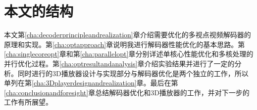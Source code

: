 \section{本文的结构}
\label{sec:thesisstructure}

本文第\ref{cha:decoderprincipleandrealization}章介绍需要优化的多视点视频解码器的原理和实现。第\ref{cha:optapproach}章说明我进行解码器性能优化的基本思路。第\ref{cha:singlecoreopt}章和第\ref{cha:parallelopt}章分别详述单核心性能优化和多核处理的并行优化过程。第\ref{cha:optresultandanalysis}章介绍实验结果并进行了一定的分析。同时进行的3D播放器设计与实现部分与解码器优化是两个独立的工作，所以单列在第\ref{cha:3Dplayerdesignandrealization}章。最后在第\ref{cha:conclusionandforesight}章总结解码器优化和3D播放器的工作，并对下一步的工作有所展望。
